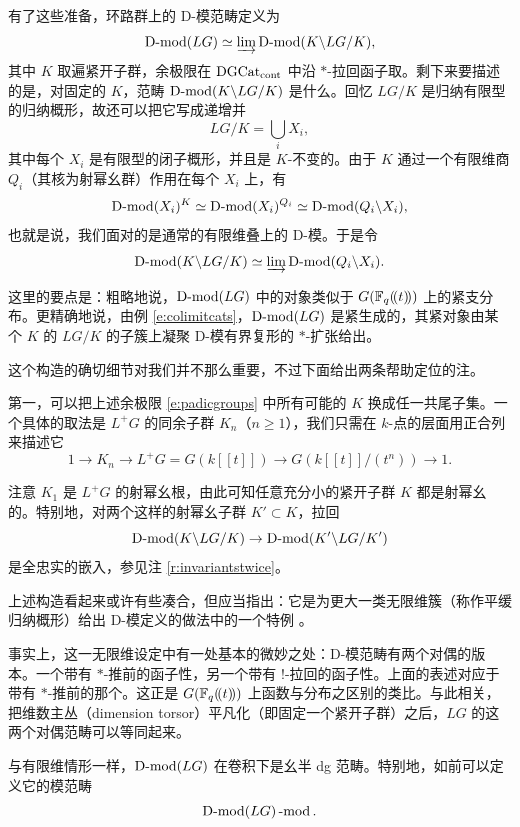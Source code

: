 有了这些准备，环路群上的 D-模范畴定义为
%
\[
\operatorname{D-mod}(LG) \simeq \varinjlim \operatorname{D-mod}(K \backslash LG / K),
\]
%
其中 $K$ 取遍紧开子群，余极限在 $\operatorname{DGCat}_{\operatorname{cont}}$ 中沿 $*$-拉回函子取。剩下来要描述的是，对固定的 $K$，范畴 $\operatorname{D-mod}(K\backslash LG/K)$ 是什么。回忆 $LG/K$ 是归纳有限型的归纳概形，故还可以把它写成递增并
%
\[
   LG/K = \bigcup_i X_i,
\]
%
其中每个 $X_i$ 是有限型的闭子概形，并且是 $K$-不变的。由于 $K$ 通过一个有限维商 $Q_i$（其核为射幂幺群）作用在每个 $X_i$ 上，有
%
\[
   \operatorname{D-mod}(X_i)^K \simeq \operatorname{D-mod}(X_i)^{Q_i} \simeq \operatorname{D-mod}(Q_i \backslash X_i),
\]
%
也就是说，我们面对的是通常的有限维叠上的 D-模。于是令
%
\[
  \operatorname{D-mod}(K \backslash LG/K) \simeq \varinjlim \operatorname{D-mod}( Q_i \backslash X_i).
\]
%

这里的要点是：粗略地说，$\operatorname{D-mod}(LG)$ 中的对象类似于 $G(\mathbb{F}_q(\!(t)\!))$ 上的紧支分布。更精确地说，由例 \ref{e:colimitcats}，$\operatorname{D-mod}(LG)$ 是紧生成的，其紧对象由某个 $K$ 的 $LG/K$ 的子簇上凝聚 D-模有界复形的 $*$-扩张给出。


这个构造的确切细节对我们并不那么重要，不过下面给出两条帮助定位的注。

\begin{re}第一，可以把上述余极限 \eqref{e:padicgroups} 中所有可能的 $K$ 换成任一共尾子集。一个具体的取法是 $L^+G$ 的同余子群 $K_n$（$n \geqslant 1$），我们只需在 $k$-点的层面用正合列来描述它
	\[
	      1 \rightarrow K_n \rightarrow L^+G = G(k[[t]]) \rightarrow
	      G(k[[t]]/(t^n)) \rightarrow 1.
	\]

注意 $K_1$ 是 $L^+G$ 的射幂幺根，由此可知任意充分小的紧开子群 $K$ 都是射幂幺的。特别地，对两个这样的射幂幺子群 $K' \subset K$，拉回
%
\[
    \operatorname{D-mod}(K \backslash LG / K) \rightarrow \operatorname{D-mod}(K' \backslash LG / K')
\]
%
是全忠实的嵌入，参见注 \ref{r:invariantstwice}。
\end{re}



\begin{re}上述构造看起来或许有些凑合，但应当指出：它是为更大一类无限维簇（称作平缓归纳概形）给出 D-模定义的做法中的一个特例 \cite{rdm}。

事实上，这一无限维设定中有一处基本的微妙之处：D-模范畴有两个对偶的版本。一个带有 $*$-推前的函子性，另一个带有 $!$-拉回的函子性。上面的表述对应于带有 $*$-推前的那个。这正是 $G(\mathbb{F}_q(\!(t)\!))$ 上函数与分布之区别的类比。与此相关，把维数主丛（dimension torsor）平凡化（即固定一个紧开子群）之后，$LG$ 的这两个对偶范畴可以等同起来。
\end{re}



\ssszh 与有限维情形一样，$\operatorname{D-mod}(LG)$ 在卷积下是幺半 dg 范畴。特别地，如前可以定义它的模范畴
%
\[
      \operatorname{D-mod}(LG)\operatorname{-mod}.
\]
%

